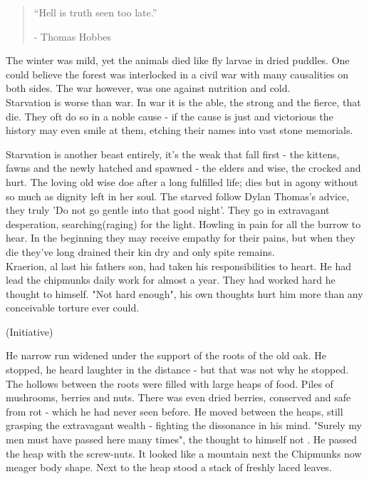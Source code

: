 \documentclass[smalldemyvopaper,11pt,twoside,onecolumn,openright,extrafontsizes]{memoir}
\begin{document}
\vspace{-1.3cm}
\begin{localsize}{10}
	\begin{quote}
		
	
	“Hell is truth seen too late.”
	\begin{flushright}- Thomas Hobbes \end{flushright}
	\end{quote} 
\end{localsize}
\vspace{1cm}


The winter was mild, yet the animals died like fly larvae in dried puddles. One could believe the forest was interlocked in a civil war with many causalities on both sides. The war however, was one against nutrition and cold. \\

Starvation is worse than war. In war it is the able, the strong and the fierce, that die. They oft do so in a noble cause - if the cause is just and victorious the history may even smile at them, etching their names into vast stone memorials. 

Starvation is another beast entirely, it's the weak that fall first - the kittens, fawns and the newly hatched and spawned - the elders and wise, the crocked and hurt. The loving old wise doe after a long fulfilled life; dies but in agony without so much as dignity left in her soul. The starved follow Dylan Thomas's advice, they truly 'Do not go gentle into that good night'. They go in extravagant desperation, searching(raging) for the light. Howling in pain for all the burrow to hear. In the beginning they may receive empathy for their pains, but when they die they've long drained their kin dry and only spite remains.\\

Kraerion, al last his fathers son, had taken his responsibilities to heart. He had lead the chipmunks daily work for almost a year. They had worked hard he thought to himself. "Not hard enough", his own thoughts hurt him more than any conceivable torture ever could. 

(Initiative)


He narrow run widened under the support of the roots of the old oak. He stopped, he heard laughter in the distance - but that was not why he stopped. The hollows between the roots were filled with large heaps of food. Piles of mushrooms, berries and nuts. There was even dried berries, conserved and safe from rot - which he had never seen before. He moved between the heaps, still grasping the extravagant wealth - fighting the dissonance in his mind. "Surely my men must have passed here many times", the thought to himself not . He passed the heap with the screw-nuts. It looked like a mountain next the Chipmunks now meager body shape. Next to the heap stood a stack of freshly laced leaves. 
\end{document}
